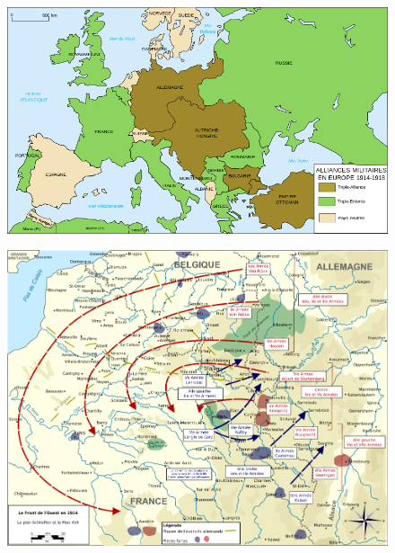 \documentclass{article}
\begin{document}
\begin{figure}[H]
	\begin{centering}
	\includegraphics[width=\linewidth]{../ressources/alliances_ww1}
	\caption{\cite{ww1}}
	\end{centering}
\end{figure}
\begin{figure}[H]
	\begin{centering}
	\includegraphics[width=\linewidth]{../ressources/strategy_ww1}
	\caption{\cite{military_strategy}}
	\end{centering}
\end{figure}
\end{document}
